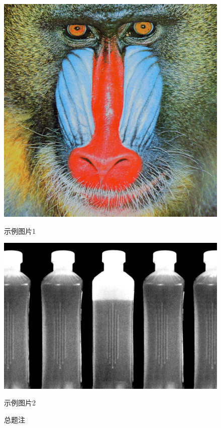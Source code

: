 \documentclass[fonset = fandol]{ctexart}
\begin{document}
\begin{figure}
	\centering
	\begin{minipage}[b]{0.48\linewidth}
		\centering
		\includegraphics[width=\linewidth]{image1}
		\caption{示例图片1}
	\end{minipage}
	\hfill
	\begin{minipage}[b]{0.48\linewidth}
		\centering
		\includegraphics[width=\linewidth]{image2}
		\caption{示例图片2}
	\end{minipage}
\caption{总题注}
\end{figure}
\end{document}
